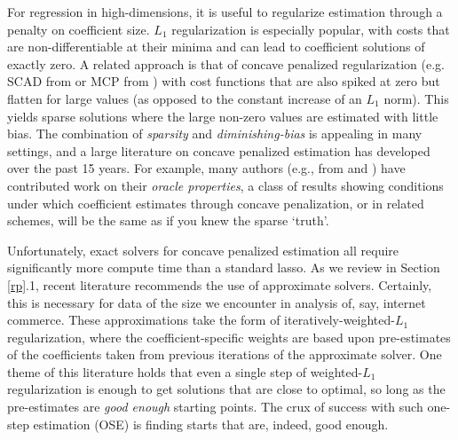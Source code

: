 \documentclass[12pt]{article}
\begin{document}
For regression in high-dimensions, it is useful to regularize estimation
through a penalty on coefficient size.   $L_1$  regularization \citep[i.e.,
the lasso of][]{tibshirani_regression_1996} is especially popular, with costs
that are non-differentiable at their minima and can lead to  coefficient
solutions of exactly zero.  A related approach is that of concave penalized
regularization (e.g. SCAD from \citealt{fan_variable_2001} or MCP from
\citealt{zhang_nearly_2010}) with cost functions that are also spiked at zero
but flatten for large values (as opposed to the constant increase of an $L_1$
norm).  This yields sparse solutions where the large non-zero values are estimated
with little bias. The combination of  \textit{sparsity} and \textit{diminishing-bias} 
 is appealing in many settings, and a large literature on concave
penalized estimation has developed over the past 15 years.  For example, many
authors (e.g., from \citealt{fan_variable_2001} and
\citealt{fan_nonconcave_2004})  have contributed work on their \textit{oracle
properties}, a class of results showing conditions under which coefficient
estimates through concave penalization, or in related schemes, will be the same
as if you knew the sparse `truth'.

Unfortunately,  exact solvers for concave penalized estimation  all require
significantly more compute time than a standard lasso.  As we review in
Section \ref{rp}.1,  recent literature recommends the use of approximate
solvers.  Certainly, this is necessary for data of the size we encounter in
analysis of, say, internet commerce.  These approximations  take the form of
iteratively-weighted-$L_1$ regularization, where the coefficient-specific
weights are based upon pre-estimates of the coefficients taken from previous
iterations of the approximate solver.  One theme of this literature
\citep[e.g.,][]{zou_one-step_2008,fan_strong_2014} 
holds that even a single step of weighted-$L_1$ regularization is enough to
get solutions that are close to optimal, so long as the pre-estimates
are \textit{good enough} starting points. The crux of success with such one-step
estimation (OSE) is  finding starts that are, indeed, good enough.
\end{document}

